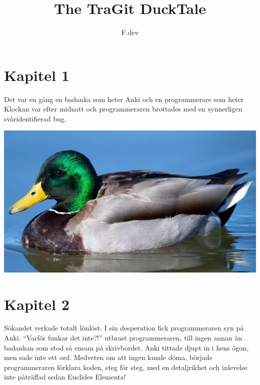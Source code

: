 \documentclass[a4paper]{article}
\begin{document}
\title{The TraGit DuckTale}
\author{F.dev}
\maketitle

\section*{Kapitel 1}
Det var en gång en badanka som heter Anki och en programmerare som heter %
Klockan var efter midnatt och programmeraren brottades med en synnerligen svåridentifierad bug.

\begin{center}
	\includegraphics[scale=0.3]{duck_that_is_not_anki.jpeg}
\end{center}


\section*{Kapitel 2}
Sökandet verkade totalt lönlöst. I sin desperation fick programmeraren syn på Anki.
``Varför funkar det inte?!'' utbrast programmeraren, till ingen annan än badankan som stod så ensam på skrivbordet.
Anki tittade djupt in i hens ögon, men sade inte ett ord. Medveten om att ingen kunde döma, började programmeraren förklara koden, steg för steg, med en detaljrikhet och inlevelse inte påträffad sedan Euclides Elementa!

\end{document}
